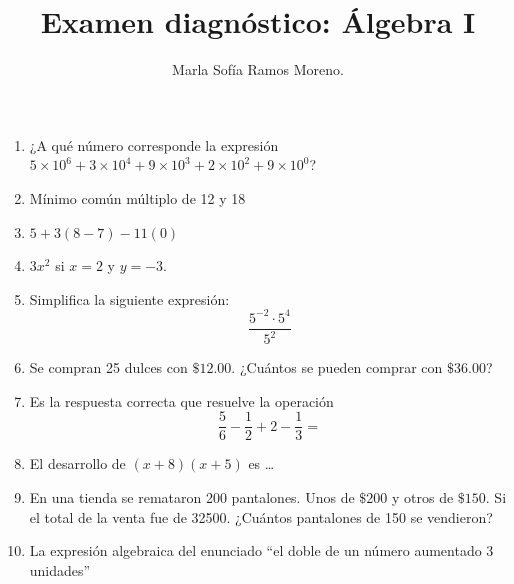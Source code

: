 \documentclass{article}
\title{Examen diagnóstico: Álgebra I}
\author{Marla Sofía Ramos Moreno.}
\begin{document}
\maketitle
\begin{enumerate}
    \item ¿A qué número corresponde la expresión \(5\times 10^6 + 3\times 10^4 + 9\times 10^3 + 2\times 10^2 + 9\times 10^0\)?
    \item Mínimo común múltiplo de 12 y 18
    \item \(5 + 3(8 - 7) - 11(0)\)
    \item \(3x^2\) si \(x = 2\) y \(y = -3\).
    \item Simplifica la siguiente expresión: \[\frac{5^{-2}\cdot5^4}{5^2}\]
    \item Se compran 25 dulces con \(\mathdollar 12.00\). ¿Cuántos se pueden comprar con \(\mathdollar 36.00\)?
    \item Es la respuesta correcta que resuelve la operación \[\frac{5}{6} - \frac{1}{2} + 2 - \frac{1}{3} = \]
    \item El desarrollo de \((x + 8)(x + 5)\) es \dots
    \item En una tienda se remataron 200 pantalones. Unos de \(\mathdollar 200\) y otros de \(\mathdollar 150\). Si el total de la venta fue de 32500. ¿Cuántos pantalones de 150 se vendieron?
    \item La expresión algebraica del enunciado ``el doble de un número aumentado 3 unidades''
\end{enumerate}
\end{document}
